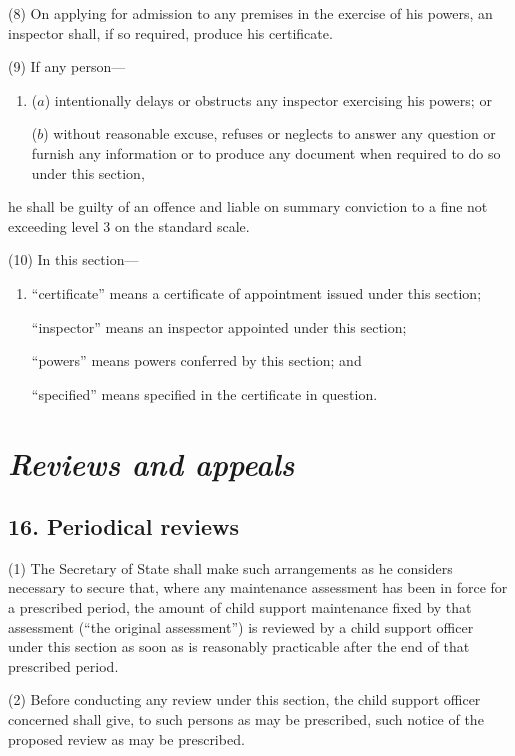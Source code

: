\documentclass[12pt,a4paper]{article}
\begin{document}
(8) On applying for admission to any premises in the exercise of his powers, an inspector shall, if so required, produce his certificate.

(9) If any person—
\begin{enumerate}\item[]
($a$) intentionally delays or obstructs any inspector exercising his powers; or

($b$) without reasonable excuse, refuses or neglects to answer any question or furnish any information or to produce any document when required to do so under this section,
\end{enumerate}
he shall be guilty of an offence and liable on summary conviction to a fine not exceeding level 3 on the standard scale.

(10) In this section—
\begin{enumerate}\item[]
    “certificate” means a certificate of appointment issued under this section;

    “inspector” means an inspector appointed under this section;

    “powers” means powers conferred by this section; and

    “specified” means specified in the certificate in question. 
\end{enumerate}


\section{\itshape Reviews and appeals}

\subsection{16. Periodical reviews}

(1) The Secretary of State shall make such arrangements as he considers necessary to secure that, where any maintenance assessment has been in force for a prescribed period, the amount of child support maintenance fixed by that assessment (“the original assessment”) is reviewed by a child support officer under this section as soon as is reasonably practicable after the end of that prescribed period.

(2) Before conducting any review under this section, the child support officer concerned shall give, to such persons as may be prescribed, such notice of the proposed review as may be prescribed.
\end{document}

